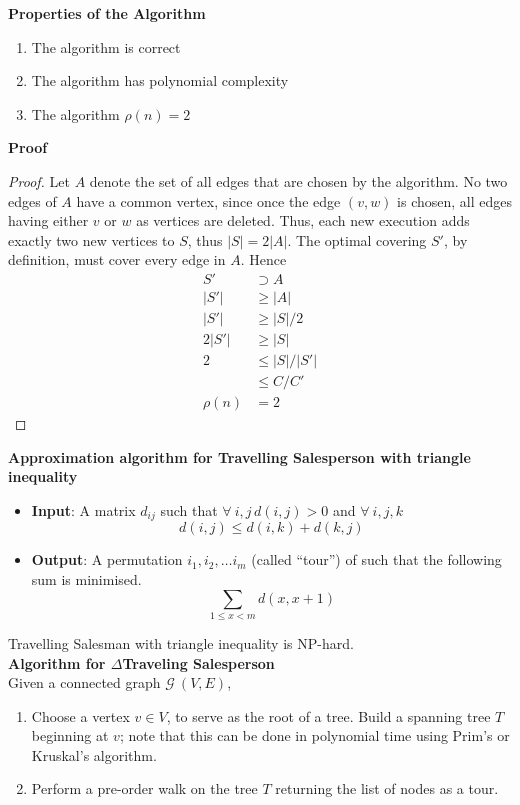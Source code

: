 \textbf{Properties of the Algorithm}
\begin{enumerate}
    \item The algorithm is correct
    \item The algorithm has polynomial complexity
    \item The algorithm $\rho(n) = 2$
\end{enumerate}
\textbf{Proof}
\begin{proof}
    Let $A$ denote the set of all edges that are chosen by the algorithm.
    No two edges of $A$ have a common vertex,
    since once the edge $(v, w)$ is chosen,
    all edges having either $v$ or $w$ as vertices are deleted.
    Thus, each new execution adds exactly two new vertices to $S$, thus $|S| = 2|A|$.
    The optimal covering $S\prime$, by definition, must cover every edge in $A$.
    Hence
    \begin{align*}
           S\prime &\supset A \\
         |S\prime| &\geq |A|\\
         |S\prime| &\geq |S|/2\\
        2|S\prime| &\geq |S|\\
                 2 &\leq |S|/|S\prime|\\
                   &\leq C/C\prime \\
           \rho(n) &= 2
    \end{align*}
\end{proof}

\textbf{Approximation algorithm for Travelling Salesperson with triangle inequality}\\
\begin{itemize}
    \item \textbf{Input}:
        A matrix $d_{ij}$ such that $\forall\ i,j\, d(i,j) > 0$ and $\forall\ i,j,k$
        $$d(i,j) \leq d(i,k) + d(k,j)$$
    \item \textbf{Output}:
        A permutation $i_1, i_2,\dots i_m$ (called “tour”) of such that the following sum is minimised.
        $$\sum_{1\leq x < m} d(x,x+1)$$
\end{itemize}
Travelling Salesman with triangle inequality is NP-hard.\\

\textbf{Algorithm for $\Delta$Traveling Salesperson}\\
Given a connected graph $\mathcal{G}\ (V,E)$,
\begin{enumerate}
    \item
        Choose a vertex $v \in V$, to serve as the root of a tree.
        Build a spanning tree $T$ beginning at $v$;
        note that this can be done in polynomial time using Prim's or Kruskal's algorithm.
    \item
        Perform a pre-order walk on the tree $T$ returning the list of nodes as a tour.
\end{enumerate}

